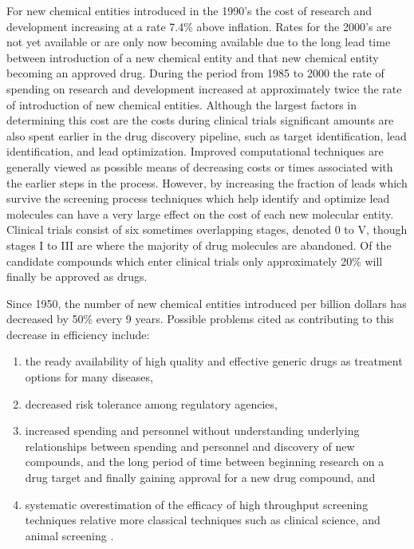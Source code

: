 For new chemical entities introduced in the 1990's the cost of research and development increasing at a rate 7.4\% above inflation.
Rates for the 2000's are not yet available or are only now becoming available due to the long lead time between introduction of a new chemical entity and that new chemical entity becoming an approved drug.
During the period from 1985 to 2000 the rate of spending on research and development increased at approximately twice the rate of introduction of new chemical entities.
Although the largest factors in determining this cost are the costs during clinical trials significant amounts are also spent earlier in the drug discovery pipeline, such as target identification, lead identification, and lead optimization.
Improved computational techniques are generally viewed as possible means of decreasing costs or times associated with the earlier steps in the process.
However, by increasing the fraction of leads which survive the screening process techniques which help identify and optimize lead molecules can have a very large effect on the cost of each new molecular entity.
Clinical trials consist of six sometimes overlapping stages, denoted 0 to V, though stages I to III are where the majority of drug molecules are abandoned.
Of the candidate compounds which enter clinical trials only approximately 20\% will finally be approved as drugs.
\cite{dimasi2003price}

Since 1950, the number of new chemical entities introduced per billion dollars has decreased by 50\% every 9 years.
Possible problems cited as contributing to this decrease in efficiency include:
\begin{enumerate}
  \item the ready availability of high quality and effective generic drugs as treatment options for many diseases,
  \item decreased risk tolerance among regulatory agencies,
  \item increased spending and personnel without understanding underlying relationships between spending and personnel and discovery of new compounds, and the long period of time between beginning research on a drug target and finally gaining approval for a new drug compound, and
  \item systematic overestimation of the efficacy of high throughput screening techniques relative more classical techniques such as clinical science, and animal screening \cite{scannell2012diagnosing}.
\end{enumerate}
